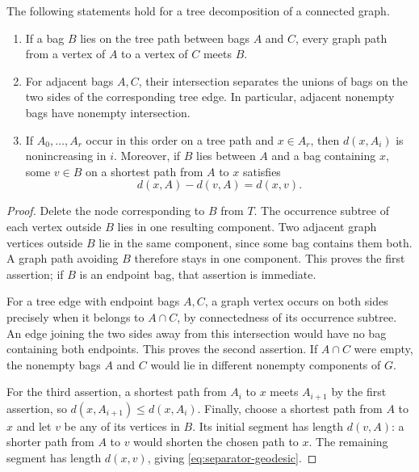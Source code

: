 \begin{lemma}\label{lem:separator}
The following statements hold for a tree decomposition of a connected graph.
\begin{enumerate}
 \item If a bag $B$ lies on the tree path between bags $A$ and $C$, every
 graph path from a vertex of $A$ to a vertex of $C$ meets $B$.
 \item For adjacent bags $A,C$, their intersection separates the unions
 of bags on the two sides of the corresponding tree edge. In particular,
 adjacent nonempty bags have nonempty intersection.
 \item If $A_0,\ldots,A_r$ occur in this order on a tree path and
 $x\in A_r$, then $d(x,A_i)$ is nonincreasing in $i$.
 Moreover, if $B$ lies between $A$ and a bag containing $x$, some
 $v\in B$ on a shortest path from $A$ to $x$ satisfies
 \begin{equation}\label{eq:separator-geodesic}
  d(x,A)-d(v,A)=d(x,v).
 \end{equation}
\end{enumerate}
\end{lemma}

\begin{proof}
Delete the node corresponding to $B$ from $T$.
The occurrence subtree of each vertex outside $B$ lies in one resulting
component. Two adjacent graph vertices outside $B$ lie in the same
component, since some bag contains them both.
A graph path avoiding $B$ therefore stays in one component.
This proves the first assertion; if $B$ is an endpoint bag, that assertion
is immediate.

For a tree edge with endpoint bags $A,C$, a graph vertex occurs on both
sides precisely when it belongs to $A\cap C$, by connectedness of its
occurrence subtree. An edge joining the two sides away from this
intersection would have no bag containing both endpoints.
This proves the second assertion. If $A\cap C$ were empty, the nonempty
bags $A$ and $C$ would lie in different nonempty components of $G$.

For the third assertion, a shortest path from $A_i$ to $x$ meets
$A_{i+1}$ by the first assertion, so
$d(x,A_{i+1})\leq d(x,A_i)$.
Finally, choose a shortest path from $A$ to $x$ and let $v$ be any of its
vertices in $B$. Its initial segment has length $d(v,A)$: a shorter path
from $A$ to $v$ would shorten the chosen path to $x$.
The remaining segment has length $d(x,v)$, giving
\eqref{eq:separator-geodesic}.
\end{proof}


